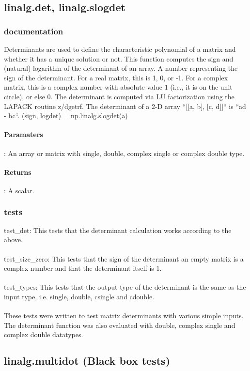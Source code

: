 \documentclass[a4paper,11pt]{article}
\begin{document}
\subsection{linalg.det, linalg.slogdet}
\subsubsection{documentation}
Determinants are used to define the characteristic polynomial of a matrix and whether it has a unique solution or not. This function computes the sign and (natural) logarithm of the determinant of an array. A number representing the sign of the determinant. For a real matrix,
this is 1, 0, or -1. For a complex matrix, this is a complex number with absolute value 1 (i.e., it is on the unit circle), or else 0. The determinant is computed via LU factorization using the LAPACK
routine z/dgetrf. The determinant of a 2-D array ``[[a, b], [c, d]]`` is ``ad - bc``. (sign, logdet) = np.linalg.slogdet(a)
\paragraph{Paramaters}: An array or matrix with single, double, complex single or complex double type. 
\paragraph{Returns}: A scalar. 
\subsubsection{tests}
test\_det: This tests that the determinant calculation works according to the above. \\
\\
test\_size\_zero: This tests that the sign of the determinant an empty matrix is a complex number and that the determinant itself is 1. \\
\\
test\_types: This tests that the output type of the determinant is the same as the input type, i.e. single, double, csingle and cdouble. \\
\\
These tests were written to test matrix determinants with various simple inputs. The determinant function was also evaluated with double, complex single and complex double datatypes. 

\subsection{linalg.multidot (Black box tests)}
\end{document}

